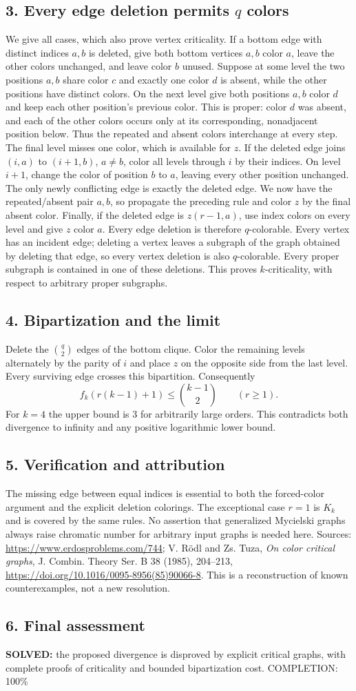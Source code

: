 \subsection*{3. Every edge deletion permits $q$ colors}
We give all cases, which also prove vertex criticality.
If a bottom edge with distinct indices $a,b$ is deleted, give both bottom vertices $a,b$ color $a$, leave the other colors unchanged, and leave color $b$ unused. Suppose at some level the two positions $a,b$ share color $c$ and exactly one color $d$ is absent, while the other positions have distinct colors. On the next level give both positions $a,b$ color $d$ and keep each other position's previous color. This is proper: color $d$ was absent, and each of the other colors occurs only at its corresponding, nonadjacent position below. Thus the repeated and absent colors interchange at every step. The final level misses one color, which is available for $z$.
If the deleted edge joins $(i,a)$ to $(i+1,b)$, $a\ne b$, color all levels through $i$ by their indices. On level $i+1$, change the color of position $b$ to $a$, leaving every other position unchanged. The only newly conflicting edge is exactly the deleted edge. We now have the repeated/absent pair $a,b$, so propagate the preceding rule and color $z$ by the final absent color.
Finally, if the deleted edge is $z(r-1,a)$, use index colors on every level and give $z$ color $a$.
Every edge deletion is therefore $q$-colorable. Every vertex has an incident edge; deleting a vertex leaves a subgraph of the graph obtained by deleting that edge, so every vertex deletion is also $q$-colorable. Every proper subgraph is contained in one of these deletions. This proves $k$-criticality, with respect to arbitrary proper subgraphs.
\subsection*{4. Bipartization and the limit}
Delete the $\binom q2$ edges of the bottom clique. Color the remaining levels alternately by the parity of $i$ and place $z$ on the opposite side from the last level. Every surviving edge crosses this bipartition. Consequently
\[
 f_k(r(k-1)+1)\le\binom{k-1}{2}\qquad(r\ge1).
\]
For $k=4$ the upper bound is $3$ for arbitrarily large orders. This contradicts both divergence to infinity and any positive logarithmic lower bound.
\subsection*{5. Verification and attribution}
The missing edge between equal indices is essential to both the forced-color argument and the explicit deletion colorings. The exceptional case $r=1$ is $K_k$ and is covered by the same rules. No assertion that generalized Mycielski graphs always raise chromatic number for arbitrary input graphs is needed here.
Sources: \url{https://www.erdosproblems.com/744}; V. R\"odl and Zs. Tuza, \emph{On color critical graphs}, J. Combin. Theory Ser. B 38 (1985), 204--213, \url{https://doi.org/10.1016/0095-8956(85)90066-8}. This is a reconstruction of known counterexamples, not a new resolution.
\subsection*{6. Final assessment}
\textbf{SOLVED:} the proposed divergence is disproved by explicit critical graphs, with complete proofs of criticality and bounded bipartization cost.
\noindent COMPLETION: 100\%
